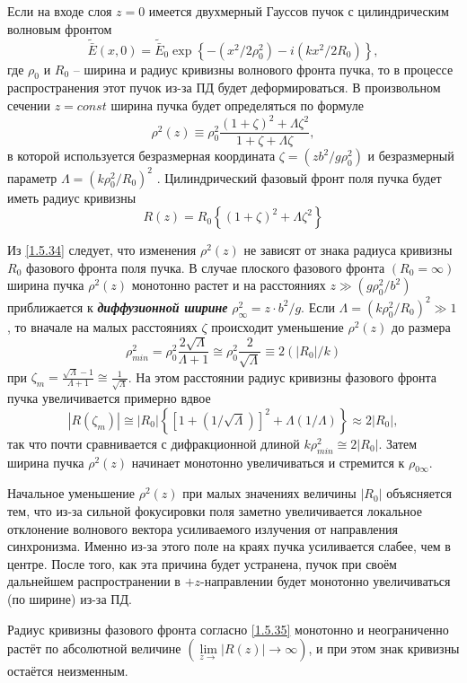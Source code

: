 \documentclass[a4paper]{article}
\begin{document}
Если на входе слоя  $z=0$ имеется двухмерный Гауссов пучок с цилиндрическим волновым фронтом 
\begin{equation}
	\tilde{\bar{E}}(x,0)=\tilde{\bar{E}}_{0}\exp\left\{-(x^{2}/2\rho_{0}^{2})-i(kx^{2}/2R_{0})\right\},
	\label{1.5.33}
\end{equation}
где $\rho_{0}$  и $R_{0}$ -- ширина и радиус кривизны волнового фронта пучка, то в процессе распространения этот пучок из-за ПД будет деформироваться. В произвольном сечении $z=const$  ширина пучка будет определяться по формуле 
\begin{equation}
	\rho^{2}(z)\equiv\rho_{0}^{2}\frac{(1+\zeta)^{2}+\Lambda\zeta^{2}}{1+\zeta+\Lambda\zeta},
	\label{1.5.34}
\end{equation}
в которой используется безразмерная координата $\zeta=(zb^{2}/g\rho_{0}^{2})$  и безразмерный параметр $\Lambda=(k\rho_{0}^{2}/R_{0})^{2}$ . Цилиндрический фазовый фронт поля пучка будет иметь радиус кривизны 
\begin{equation}
	R(z)=R_{0}\left\{(1+\zeta)^{2}+\Lambda\zeta^{2}\right\}
	\label{1.5.35}
\end{equation}

Из \eqref{1.5.34} следует, что изменения $\rho^{2}(z)$  не зависят от знака радиуса кривизны $R_{0}$  фазового фронта поля пучка. В случае плоского фазового фронта $(R_{0}=\infty)$ ширина пучка $\rho^{2}(z)$ монотонно растет и на расстояниях $z\gg(g\rho_{0}^{2}/b^{2})$  приближается к \textbf{\textit{диффузионной ширине}} $\rho_{\infty}^{2}=z\cdot b^{2}/g$. 
Если $\Lambda=(k\rho_{0}^{2}/R_{0})^{2}\gg1$, то вначале на малых расстояниях $\zeta$  происходит уменьшение $\rho^{2}(z)$  до размера $$\rho_{min}^{2}=\rho_{0}^{2}\frac{2\sqrt{\Lambda}}{\Lambda+1}\cong\rho_{0}^{2}\frac{2}{\sqrt{\Lambda}}\equiv2\left(\left|{R_{0}}\right|/k\right)$$
при	$\zeta_{m}=\frac{\sqrt{\Lambda}-1}{\Lambda+1}\cong\frac{1}{\sqrt{\Lambda}}$. На этом расстоянии радиус кривизны фазового фронта пучка увеличивается примерно вдвое $$\left|R(\zeta_{m})\right|\cong\left|R_{0}\right|\left\{\left[1+\left(1/\sqrt{\Lambda}\right)\right]^{2}+\Lambda(1/\Lambda)\right\}\approx2\left|R_{0}\right|,$$
так что почти сравнивается с дифракционной длиной $k\rho_{min}^{2}\cong2\left|R_{0}\right|$. Затем ширина пучка $\rho^{2}(z)$  начинает монотонно увеличиваться и стремится к $\rho_{0\infty}$.

Начальное уменьшение $\rho^{2}(z)$ при малых значениях величины $\left|R_{0}\right|$ объясняется тем, что из-за сильной фокусировки поля заметно увеличивается локальное отклонение волнового вектора усиливаемого излучения от направления синхронизма. Именно из-за этого поле на краях пучка усиливается слабее, чем в центре. После того, как эта причина будет устранена, пучок при своём дальнейшем распространении в $+z$-направлении будет монотонно увеличиваться (по ширине) из-за ПД. 

Радиус кривизны фазового фронта согласно \eqref{1.5.35} монотонно и неограниченно растёт по абсолютной величине $\left(\lim\limits_{z\rightarrow}\left|R(z)\right|\rightarrow\infty\right)$, и при этом знак кривизны остаётся неизменным. 
\end{document}
